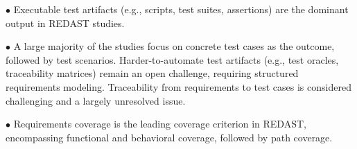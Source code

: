 \begin{tcolorbox}[mybox, breakable, title=RQ3 Key Takeaways]
$\bullet$ Executable test artifacts (e.g., scripts, test suites, assertions) are the dominant output in REDAST studies. 

$\bullet$ A large majority of the studies focus on concrete test cases as the outcome, followed by test scenarios. Harder-to-automate test artifacts (e.g., test oracles, traceability matrices) remain an open challenge, requiring structured requirements modeling. Traceability from requirements to test cases is considered challenging and a largely unresolved issue.

$\bullet$ Requirements coverage is the leading coverage criterion in REDAST, encompassing functional and behavioral coverage, followed by path coverage.

\end{tcolorbox}






